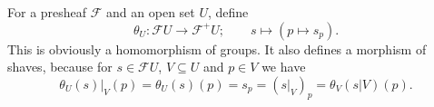 For a presheaf $\mathcal{F}$ and an open set $U$, define
\[ \theta_U\colon \mathcal{F}U\to \mathcal{F}^+U;\qquad s\mapsto (p\mapsto s_p). \]
This is obviously a homomorphism of groups. It also defines a morphism of shaves,
because for $s \in \mathcal{F}U$, $V \subseteq U$ and $p \in V$ we have
\[ \theta_U(s)|_V(p) = \theta_U(s)(p) = s_p = (s|_V)_p =  \theta_V(s|V)(p). \]
